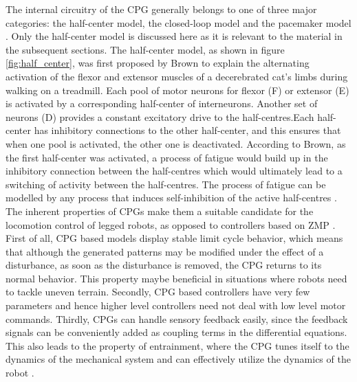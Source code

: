 \documentclass[12pt,twoside]{article}
\theoremstyle{plain}
\theoremstyle{definition}
\theoremstyle{remark}
\newcommand{\forceindent}{\leavevmode{\parindent=2em\indent}}
\begin{document}
\forceindent The internal circuitry of the CPG generally belongs to one of three major categories: the half-center model, the closed-loop model and the pacemaker model \cite{neurobiology1994shepherd}. Only the half-center model is discussed here as it is relevant to the material in the subsequent sections. The half-center model, as shown in figure \ref{fig:half_center}, was first proposed by Brown \cite{brown1914nature} to explain the alternating activation of the flexor and extensor muscles of a decerebrated cat's limbs during walking on a treadmill. Each pool of motor neurons for flexor (F) or extensor (E) is activated by a corresponding half-center of interneurons. Another set of neurons (D) provides a constant excitatory drive to the half-centres.Each half-center has inhibitory connections to the other half-center, and this ensures that when one pool is activated, the other one is deactivated. According to Brown, as the first half-center was activated, a process of fatigue would build up in the inhibitory connection between the half-centres which would ultimately lead to a switching of activity between the half-centres. The process of fatigue can be modelled by any process that induces self-inhibition of the active half-centres \cite{neurobiology1994shepherd}.\\
\forceindent The inherent properties of CPGs make them a suitable candidate for the locomotion control of legged robots, as opposed to controllers based on ZMP \cite{Ijspeert2008}. First of all, CPG based models display stable limit cycle behavior, which means that although the generated patterns may be modified under the effect of a disturbance, as soon as the disturbance is removed, the CPG returns to its normal behavior. This property maybe beneficial in situations where robots need to tackle uneven terrain. Secondly, CPG based controllers have very few parameters and hence higher level controllers need not deal with low level motor commands. Thirdly, CPGs can handle sensory feedback easily, since the feedback signals can be conveniently added as coupling terms in the differential equations. This also leads to the property of entrainment, where the CPG tunes itself to the dynamics of the mechanical system and can effectively utilize the dynamics of the robot \cite{Ijspeert2008}.
\end{document}
